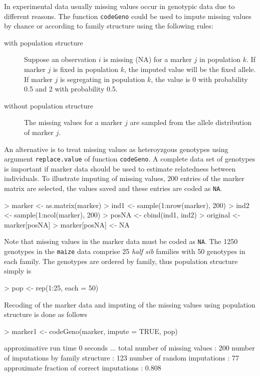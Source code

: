 \documentclass[a4paper,11pt]{article}
\begin{document}
In experimental data usually missing values occur in genotypic data due to different reasons.  
The function \texttt{codeGeno} could be used to impute missing values by chance or according to family structure using the following rules:
\begin{description}
\item[with population structure]
Suppose an observation $i$ is missing (NA) for a marker $j$ in population $k$. If marker $j$ is fixed in population $k$, 
the imputed value will be the fixed allele. If marker $j$ is segregating in population $k$, 
the value is 0 with probability 0.5 and 2 with probability 0.5.
\item[without population structure] The missing values for a marker $j$ are sampled from the allele distribution of marker $j$.
\end{description}   
An alternative is to treat missing values as heteroyzgous genotypes using argument \texttt{replace.value} of function \texttt{codeGeno}.      
A complete data set of genotypes is important if marker data should be used to estimate relatedness between individuals.
To illustrate imputing of missing values, 200 entries of the marker matrix are selected, the values saved and these entries are coded as \texttt{NA}. 
\begin{Schunk}
\begin{Sinput}
> marker <- as.matrix(marker)
> ind1 <- sample(1:nrow(marker), 200)
> ind2 <- sample(1:ncol(marker), 200)
> posNA <- cbind(ind1, ind2)
> original <- marker[posNA]
> marker[posNA] <- NA
\end{Sinput}
\end{Schunk}
Note that missing values in the marker data must be coded as \texttt{NA}.                                                                                                                                                                                    
The  1250 genotypes in the \texttt{maize} data comprise 25 \textit{half sib} families with 50 genotypes in each family. The genotypes are ordered by family, thus population structure simply is
\begin{Schunk}
\begin{Sinput}
> pop <- rep(1:25, each = 50)
\end{Sinput}
\end{Schunk}
Recoding of the marker data and imputing of the missing  values using population structure is done as follows
\begin{Schunk}
\begin{Sinput}
> marker1 <- codeGeno(marker, impute = TRUE, pop)
\end{Sinput}
\begin{Soutput}
approximative run time  0  seconds 
 ... 
total number of missing values                : 200 
number of imputations by family structure     : 123 
number of random imputations                  : 77 
approximate fraction of correct imputations : 0.808 
\end{Soutput}
\end{Schunk}
\end{document}
